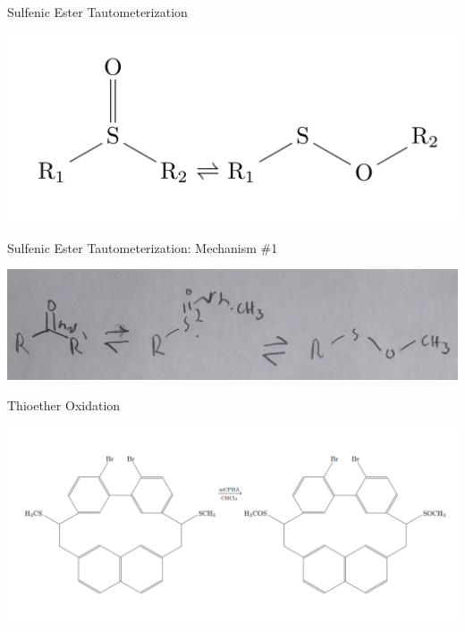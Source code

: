 \documentclass[notes]{beamer}
\begin{document}
\begin{frame}{Sulfenic Ester Tautometerization}
\begin{center}
    \includegraphics[scale=.52]{sulfenic_ester_tautometerization_overall.PNG}
\end{center}
\end{frame}

\begin{frame}{Sulfenic Ester Tautometerization: Mechanism \#1}
\begin{center}
    \includegraphics[scale=.32]{sulfenic_ester_tautomerization_one.JPG}
\end{center}
\end{frame}

\begin{frame}{Thioether Oxidation}
\begin{center}
    \includegraphics[scale=.45]{thioether_oxidation_overall.PNG}
\end{center}
\end{frame}
\end{document}
